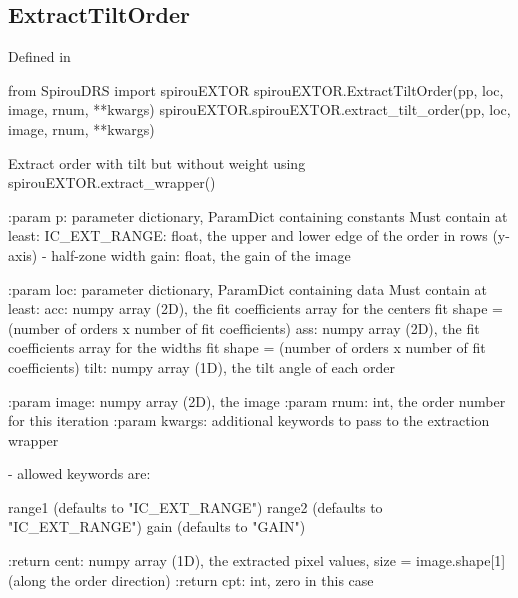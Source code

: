 \begin{minipage}{\textwidth}
\subsection{ExtractTiltOrder}

Defined in \spirouEXTOR{}

\begin{pythonbox}
from SpirouDRS import spirouEXTOR
spirouEXTOR.ExtractTiltOrder(pp, loc, image, rnum, **kwargs)
spirouEXTOR.spirouEXTOR.extract_tilt_order(pp, loc, image, rnum, **kwargs)
\end{pythonbox}

\begin{pythondocstring}
Extract order with tilt but without weight using
spirouEXTOR.extract_wrapper()

:param p: parameter dictionary, ParamDict containing constants
    Must contain at least:
            IC_EXT_RANGE: float, the upper and lower edge of the order
                          in rows (y-axis) - half-zone width
            gain: float, the gain of the image

:param loc: parameter dictionary, ParamDict containing data
        Must contain at least:
            acc: numpy array (2D), the fit coefficients array for
                  the centers fit
                  shape = (number of orders x number of fit coefficients)
            ass: numpy array (2D), the fit coefficients array for
                  the widths fit
                  shape = (number of orders x number of fit coefficients)
            tilt: numpy array (1D), the tilt angle of each order

:param image: numpy array (2D), the image
:param rnum: int, the order number for this iteration
:param kwargs: additional keywords to pass to the extraction wrapper

        - allowed keywords are:

        range1  (defaults to "IC_EXT_RANGE")
        range2  (defaults to "IC_EXT_RANGE")
        gain    (defaults to "GAIN")

:return cent: numpy array (1D), the extracted pixel values,
             size = image.shape[1] (along the order direction)
:return cpt: int, zero in this case
\end{pythondocstring}
\end{minipage}


